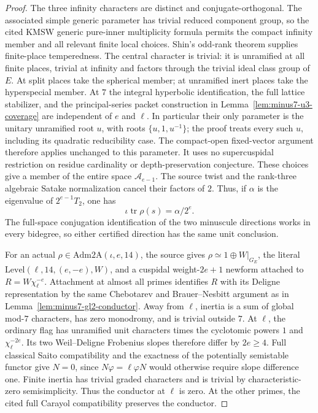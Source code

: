 \begin{proof}
The three infinity characters are distinct and conjugate-orthogonal.
The associated simple generic parameter has trivial reduced
component group, so the cited KMSW generic pure-inner multiplicity
formula permits the compact infinity member and all relevant
finite local choices. Shin's odd-rank theorem supplies finite-place
temperedness. The central character is trivial: it is unramified
at all finite places, trivial at infinity and factors through the
trivial ideal class group of $E$.
At split places take the spherical member; at unramified inert
places take the hyperspecial member. At $7$ the integral hyperbolic
identification, the full lattice stabilizer, and the principal-series
packet construction in Lemma~\ref{lem:minus7-u3-coverage} are
independent of $e$ and $\ell$. In particular their only parameter
is the unitary unramified root $u$, with roots
$\{u,1,u^{-1}\}$; the proof treats every such $u$, including its
quadratic reducibility case. The compact-open fixed-vector argument
therefore applies unchanged to this parameter. It uses no
supercuspidal restriction on residue cardinality or depth-preservation
conjecture. These choices give a member of the entire space
$\mathcal A_{e-1}$.
The source twist and the rank-three algebraic Satake normalization
cancel their factors of $2$. Thus, if $\alpha$ is the eigenvalue of
$2^{e-1}T_2$, one has
\[
                  \iota\operatorname{tr}\rho(s)=\alpha/2^e.
 \tag{GS7.3}
\]
The full-space conjugation identification of the two minuscule
directions works in every bidegree, so either certified direction
has the same unit conclusion.

For an actual $\rho\in\mathrm{Adm2A}(\iota,e,14)$, the source
gives $\rho\simeq1\oplus W|_{G_E}$, the literal
$\mathrm{Level}(\ell,14,(e,-e),W)$, and a cuspidal weight-$2e+1$
newform attached to $R=W\chi_\ell^{-e}$. Attachment at almost all
primes identifies $R$ with its Deligne representation by the same
Chebotarev and Brauer--Nesbitt argument as in
Lemma~\ref{lem:minus7-gl2-conductor}.
Away from $\ell$, inertia is a sum of global mod-$7$ characters,
has zero monodromy, and is trivial outside $7$.
At $\ell$, the ordinary flag has unramified unit characters times
the cyclotomic powers $1$ and $\chi_\ell^{-2e}$. Its two
Weil--Deligne Frobenius slopes therefore differ by $2e\geq4$.
Full classical Saito compatibility and the exactness of the
potentially semistable functor give $N=0$, since
$N\varphi=\ell\varphi N$ would otherwise require slope difference
one. Finite inertia has trivial graded characters and is trivial
by characteristic-zero semisimplicity. Thus the conductor at
$\ell$ is zero. At the other primes, the cited full Carayol
compatibility preserves the conductor.


\end{proof}
